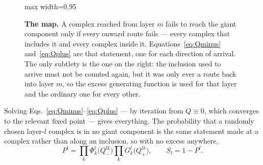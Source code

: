 \begin{figure}[t]
\centering
\begin{adjustbox}{max width=0.95\linewidth}
\end{adjustbox}
\caption{\textbf{The map.} A complex reached from layer $m$ fails to reach the
giant component only if every onward route fails --- every complex that includes
it and every complex inside it. Equations~\eqref{eq:Qminus}
and~\eqref{eq:Qplus} are that statement, one for each direction of arrival. The
only subtlety is the one on the right: the inclusion used to arrive must not be
counted again, but it was only ever a route back into layer $m$, so the excess
generating function is used for that layer and the ordinary one for every other.}
\label{fig:themap}
\end{figure}

Solving Eqs.~\eqref{eq:Qminus}--\eqref{eq:Qplus} --- by iteration from
$Q\equiv0$, which converges to the relevant fixed point --- gives everything.
The probability that a randomly chosen layer-$l$ complex is in no giant
component is the same statement made at a complex rather than along an
inclusion, so with no excess anywhere,
\begin{equation}
  P^{l}=\prod_{k}\Phi^{l}_{k}\bigl(Q^{lk}_{-}\bigr)
        \prod_{k}G^{l}_{k}\bigl(Q^{lk}_{+}\bigr),
  \qquad S_{l}=1-P^{l}.
  \label{eq:Sl}
\end{equation}

